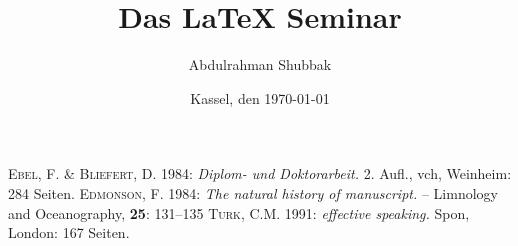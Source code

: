 \documentclass[a4paper, 12pt, titlepage]{article}
\title{Das \LaTeX{} Seminar}
\author{Abdulrahman Shubbak}
\date{Kassel, den \today}
\begin{document}
\begin{thebibliography}{AA}
   \textsc{Ebel}, F. \& \textsc{Bliefert}, D.
   1984: \emph{Diplom- und Doktorarbeit.}
   2. Aufl., vch, Weinheim: 284 Seiten.
   \textsc{Edmonson}, F. 
   1984: \emph{The natural history of manuscript.} -- 
   Limnology and Oceanography, \textbf{25}: 131--135 
   \textsc{Turk}, C.M. 
   1991: \emph{effective speaking.}
   Spon, London: 167 Seiten.
\end{thebibliography}
\end{document}
